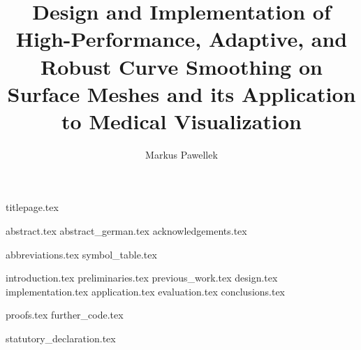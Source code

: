 \documentclass[fleqn,10pt,twoside]{stdglobal}
\title{Design and Implementation of High-Performance, Adaptive, and Robust Curve Smoothing on Surface Meshes and its Application to Medical Visualization}
\author{Markus Pawellek}
\let\oldpagenumbering\pagenumbering
\renewcommand*\pagenumbering[1]{\cleardoublepage\oldpagenumbering{#1}}
\begin{document}

  {titlepage.tex}

  {abstract.tex}
  \cleardoublepage
  {abstract_german.tex}
  {acknowledgements.tex}

  \tableofcontents
  \listoffigures
  \listoftables
  \listofmath
  {
    \small
    \listofcode
  }
  {abbreviations.tex}
  {symbol_table.tex}

  {introduction.tex}
  {preliminaries.tex}
  {previous_work.tex}
  {design.tex}
  {implementation.tex}
  {application.tex}
  {evaluation.tex}
  {conclusions.tex}

  \nocite{*}
  \printbibheading[heading=bibintoc]
  \printbibliography[heading=subbibliography,title={Books},type=book]
  \printbibliography[heading=subbibliography,title={Online Resources},type=online]
  \printbibliography[heading=subbibliography,title={General},nottype=book,nottype=online]

  \appendix
  {proofs.tex}
  {further_code.tex}

  {statutory_declaration.tex}
\end{document}

